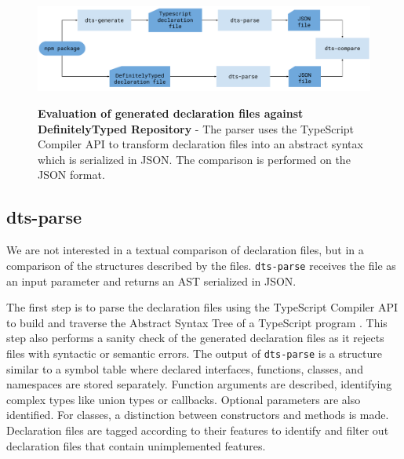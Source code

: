 \documentclass[sigconf]{acmart}
\begin{document}
\begin{figure}[tp]
  \begin{centering}
      {\includegraphics[width=1\linewidth]{evaluation-diagram.pdf}}
      \caption[Evaluation against DefinitelyTyped Repository]{\textbf{Evaluation of
          generated declaration files against DefinitelyTyped Repository} - The parser
        uses the TypeScript Compiler           API \cite{typescript-compiler-api} to
        transform declaration files into an abstract syntax which is serialized in
        JSON. The comparison is performed on the JSON format.} 
      \label{fig:evaluation-diagram}
  \end{centering}
\end{figure}

\subsection{dts-parse}
\label{sec:dts-parse}

We are not interested in a textual comparison of declaration files, but in a
comparison of the structures described by the
files. \texttt{dts-parse} receives the file as an input
parameter and returns an AST serialized in JSON.

The first step is to parse the declaration files using the TypeScript
Compiler API to build and traverse the 
Abstract Syntax Tree of a TypeScript program
\cite{typescript-compiler-api}. 
This step also performs a sanity check of the generated declaration
files as it rejects files with syntactic or semantic errors.
The output of \texttt{dts-parse} is a structure similar to a symbol table where declared
{interfaces}, {functions}, {classes}, and
{namespaces} are stored separately. Function arguments are
described, identifying complex types like union types or
callbacks. Optional parameters are also identified. For
{classes}, a distinction between constructors and methods
is made. Declaration files are tagged according to their features to identify and filter out declaration files
that contain unimplemented features.


\end{document}
